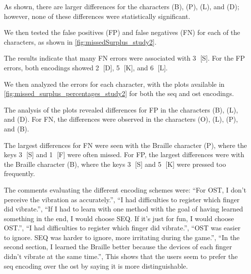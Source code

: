 As shown, there are larger differences for the characters (B), (P), (L), and (D); however, none of these differences were statistically significant.


We then tested the false positives (FP) and false negatives (FN) for each of the characters, as shown in \autoref{fig:missedSurplus_study2}.

The results indicate that many FN errors were associated with \textcircled{3} [S]. For the FP errors, both encodings showed \textcircled{2} [D], \textcircled{5} [K], and \textcircled{6} [L].

We then analyzed the errors for each character, with the plots available in \autoref{fig:missed_surplus_percentages_study2} for both the \gls{seq} and \gls{ost} encodings.

The analysis of the plots revealed differences for FP in the characters (B), (L), and (D). For FN, the differences were observed in the characters (O), (L), (P), and (B).

The largest differences for FN were seen with the Braille character (P), where the keys \textcircled{3} [S] and \textcircled{1} [F] were often missed. For FP, the largest differences were with the Braille character (B), where the keys \textcircled{3} [S] and \textcircled{5} [K] were pressed too frequently.

The comments evaluating the different encoding schemes were:
\enquote{For OST, I don't perceive the vibration as accurately.},
\enquote{I had difficulties to register which finger did vibrate.},
\enquote{If I had to learn with one method with the goal of having learned something in the end, I would choose SEQ. If it's just for fun, I would choose OST.},
\enquote{I had difficulties to register which finger did vibrate.},
\enquote{OST was easier to ignore. SEQ was harder to ignore, more irritating during the game.},
\enquote{In the second section, I learned the Braille better because the devices of each finger didn’t vibrate at the same time.},
This shows that the users seem to prefer the \gls{seq} encoding over the \gls{ost} by saying it is more distinguishable.



